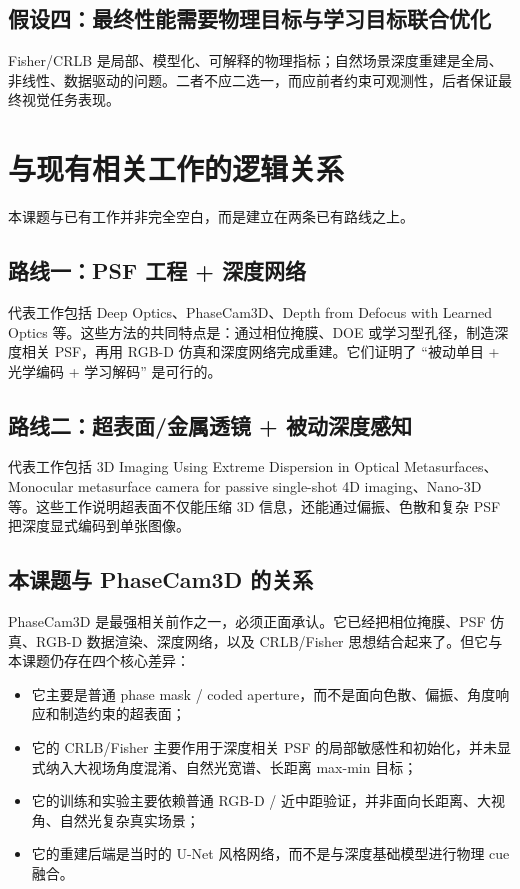 \documentclass[11pt,a4paper,fontset=none]{ctexart}
\begin{document}
\subsection{假设四：最终性能需要物理目标与学习目标联合优化}

Fisher/CRLB 是局部、模型化、可解释的物理指标；自然场景深度重建是全局、非线性、数据驱动的问题。二者不应二选一，而应前者约束可观测性，后者保证最终视觉任务表现。

\section{与现有相关工作的逻辑关系}

本课题与已有工作并非完全空白，而是建立在两条已有路线之上。

\subsection{路线一：PSF 工程 + 深度网络}

代表工作包括 Deep Optics、PhaseCam3D、Depth from Defocus with Learned Optics 等。这些方法的共同特点是：通过相位掩膜、DOE 或学习型孔径，制造深度相关 PSF，再用 RGB-D 仿真和深度网络完成重建。它们证明了 ``被动单目 + 光学编码 + 学习解码'' 是可行的。

\subsection{路线二：超表面/金属透镜 + 被动深度感知}

代表工作包括 3D Imaging Using Extreme Dispersion in Optical Metasurfaces、Monocular metasurface camera for passive single-shot 4D imaging、Nano-3D 等。这些工作说明超表面不仅能压缩 3D 信息，还能通过偏振、色散和复杂 PSF 把深度显式编码到单张图像。

\subsection{本课题与 PhaseCam3D 的关系}

PhaseCam3D 是最强相关前作之一，必须正面承认。它已经把相位掩膜、PSF 仿真、RGB-D 数据渲染、深度网络，以及 CRLB/Fisher 思想结合起来了。但它与本课题仍存在四个核心差异：

\begin{itemize}
  \item 它主要是普通 phase mask / coded aperture，而不是面向色散、偏振、角度响应和制造约束的超表面；
  \item 它的 CRLB/Fisher 主要作用于深度相关 PSF 的局部敏感性和初始化，并未显式纳入大视场角度混淆、自然光宽谱、长距离 max-min 目标；
  \item 它的训练和实验主要依赖普通 RGB-D / 近中距验证，并非面向长距离、大视角、自然光复杂真实场景；
  \item 它的重建后端是当时的 U-Net 风格网络，而不是与深度基础模型进行物理 cue 融合。
\end{itemize}
\end{document}
